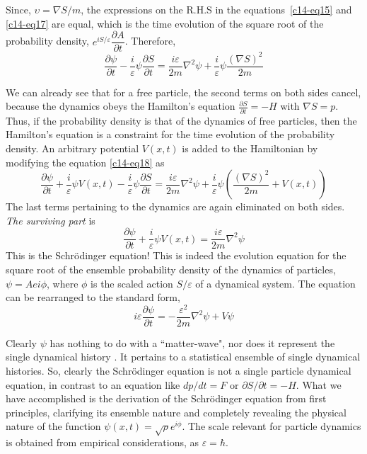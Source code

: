 Since, $\upsilon = \nabla S/m$, the expressions on the R.H.S in the equations~\ref{c14-eq15} and \ref{c14-eq17} are equal,
which is the time evolution of the square root of the probability density, $e^{iS/ \varepsilon} \dfrac{\partial A}{\partial t}$. Therefore,
\begin{equation*}
\frac{\partial \psi}{\partial t} - \frac{i}{\varepsilon} \psi \frac{\partial S}{\partial t} = \frac{i\varepsilon}{2m} \nabla^2 \psi + \frac{i}{\varepsilon} \psi\frac{(\nabla S)^2}{2m} \tag{18}\label{c14-eq18}
\end{equation*}

We can already see that for a free particle, the second terms on both sides cancel, because
the dynamics obeys the Hamilton's equation $\frac{\partial S}{\partial t} = -H$
with $\nabla S = p$. Thus, if the probability density is that of the dynamics of free particles, then
the Hamilton's equation is a constraint for the time evolution of the probability density.
An arbitrary potential $V(x, t)$ is added to the Hamiltonian by modifying the equation \ref{c14-eq18} as
\begin{equation*}
\frac{\partial\psi}{\partial t}+\frac{i}{\varepsilon}\psi V(x,t)-\frac{i}{\varepsilon}\psi\frac{\partial S}{\partial t}=
\frac{i\varepsilon}{2m}\nabla^2\psi+\frac{i}{\varepsilon}\psi\left(
\frac{(\nabla S)^2}{2m}+V(x,t)\right)\tag{19}\label{c14-eq19}
\end{equation*}
The last terms pertaining to the dynamics are again eliminated on both sides. \textit{The surviving part} is
\begin{equation*}
\frac{\partial \psi}{\partial t}+\frac{i}{\varepsilon}\psi V(x,t)=\frac{i\varepsilon}{2m}\nabla^2\psi\tag{20}\label{c14-eq20}
\end{equation*}
This is the Schr\"{o}dinger equation! This is indeed the evolution equation for the square root
of the ensemble probability density of the dynamics of particles, $\psi = Aei\phi$, where $\phi$ is the
scaled action $S/\varepsilon$ of a dynamical system. The equation can be rearranged to the standard
form,
\begin{equation*}
i \varepsilon \frac{\partial \psi}{\partial t} = - \frac{\varepsilon^2}{2m} \nabla^2 \psi + V \psi \tag{21}\label{c14-eq21}
\end{equation*}

Clearly $\psi$ has nothing to do with a ``matter-wave", nor does it represent the single dynamical
history \cite{chap14-key2}. It pertains to a statistical ensemble of single dynamical histories. So, clearly the
Schr\"{o}dinger equation is not a single particle dynamical equation, in contrast to an equation
like $dp/dt = F$ or $\partial S/\partial t=-H$. What we have accomplished is the derivation of the Schr\"{o}dinger equation
from first principles, clarifying its ensemble nature and completely revealing the physical
nature of the function $\psi (x, t) = \sqrt{\rho}e^{i\phi}$. The scale relevant for particle dynamics is obtained
from empirical considerations, as $\varepsilon = \hbar$.

